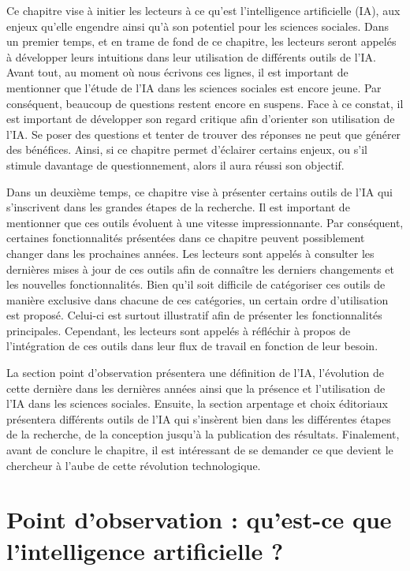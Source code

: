 \documentclass[
  letterpaper,
  DIV=11,
  numbers=noendperiod,
  oneside]{scrreprt}
\begin{document}
Ce chapitre vise à initier les lecteurs à ce qu'est l'intelligence
artificielle (IA), aux enjeux qu'elle engendre ainsi qu'à son potentiel
pour les sciences sociales. Dans un premier temps, et en trame de fond
de ce chapitre, les lecteurs seront appelés à développer leurs
intuitions dans leur utilisation de différents outils de l'IA. Avant
tout, au moment où nous écrivons ces lignes, il est important de
mentionner que l'étude de l'IA dans les sciences sociales est encore
jeune. Par conséquent, beaucoup de questions restent encore en suspens.
Face à ce constat, il est important de développer son regard critique
afin d'orienter son utilisation de l'IA. Se poser des questions et
tenter de trouver des réponses ne peut que générer des bénéfices. Ainsi,
si ce chapitre permet d'éclairer certains enjeux, ou s'il stimule
davantage de questionnement, alors il aura réussi son objectif.

Dans un deuxième temps, ce chapitre vise à présenter certains outils de
l'IA qui s'inscrivent dans les grandes étapes de la recherche. Il est
important de mentionner que ces outils évoluent à une vitesse
impressionnante. Par conséquent, certaines fonctionnalités présentées
dans ce chapitre peuvent possiblement changer dans les prochaines
années. Les lecteurs sont appelés à consulter les dernières mises à jour
de ces outils afin de connaître les derniers changements et les
nouvelles fonctionnalités. Bien qu'il soit difficile de catégoriser ces
outils de manière exclusive dans chacune de ces catégories, un certain
ordre d'utilisation est proposé. Celui-ci est surtout illustratif afin
de présenter les fonctionnalités principales. Cependant, les lecteurs
sont appelés à réfléchir à propos de l'intégration de ces outils dans
leur flux de travail en fonction de leur besoin.

La section point d'observation présentera une définition de l'IA,
l'évolution de cette dernière dans les dernières années ainsi que la
présence et l'utilisation de l'IA dans les sciences sociales. Ensuite,
la section arpentage et choix éditoriaux présentera différents outils de
l'IA qui s'insèrent bien dans les différentes étapes de la recherche, de
la conception jusqu'à la publication des résultats. Finalement, avant de
conclure le chapitre, il est intéressant de se demander ce que devient
le chercheur à l'aube de cette révolution technologique.

\hypertarget{point-dobservation-quest-ce-que-lintelligence-artificielle}{%
\section{Point d'observation : qu'est-ce que l'intelligence artificielle
?}\label{point-dobservation-quest-ce-que-lintelligence-artificielle}}
\end{document}
